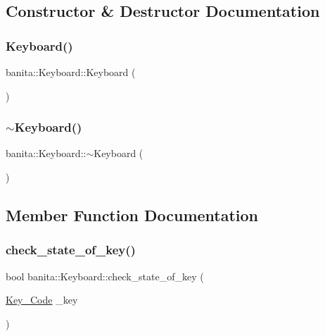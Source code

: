 \subsection{Constructor \& Destructor Documentation}
\mbox{\label{classbanita_1_1_keyboard_a23037aab0ad7e176946b93e971cf946c}} 
\subsubsection{\texorpdfstring{Keyboard()}{Keyboard()}}
{\footnotesize\ttfamily banita\+::\+Keyboard\+::\+Keyboard (\begin{DoxyParamCaption}{ }\end{DoxyParamCaption})}

\mbox{\label{classbanita_1_1_keyboard_ab74e25dd5635a78f3fa18b4813e22888}} 
\subsubsection{\texorpdfstring{$\sim$Keyboard()}{~Keyboard()}}
{\footnotesize\ttfamily banita\+::\+Keyboard\+::$\sim$\+Keyboard (\begin{DoxyParamCaption}{ }\end{DoxyParamCaption})\hspace{0.3cm}{\ttfamily [inline]}}



\subsection{Member Function Documentation}
\mbox{\label{classbanita_1_1_keyboard_a7d92be8f7f9f629d8ec4f8da0c5367d5}} 
\subsubsection{\texorpdfstring{check\_state\_of\_key()}{check\_state\_of\_key()}}
{\footnotesize\ttfamily bool banita\+::\+Keyboard\+::check\+\_\+state\+\_\+of\+\_\+key (\begin{DoxyParamCaption}\item[{\mbox{\hyperlink{classbanita_1_1_keyboard_a0dee214e6cb4f246866603b85568b9ab}{Key\+\_\+\+Code}}}]{\+\_\+key }\end{DoxyParamCaption})\hspace{0.3cm}{\ttfamily [inline]}}



